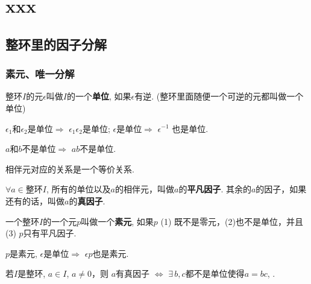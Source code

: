 \chapter{xxx}

\section{整环里的因子分解}

\subsection{素元、唯一分解}

\begin{Definition}[单位]
整环$I$的元$\epsilon$叫做$I$的一个\textbf{单位}, 如果$\epsilon$有逆. (整环里面随便一个可逆的元都叫做一个单位)
\end{Definition}

\begin{Theorem}
$\epsilon_1$和$\epsilon_2$是单位$\Rightarrow$ $\epsilon_1 \epsilon_2$是单位; $\epsilon$是单位$\Rightarrow$ $\epsilon^{-1}$ 也是单位.
\end{Theorem}

\begin{Proposition}
$a$和$b$不是单位$\Rightarrow$ $a b$不是单位.
\end{Proposition}


\begin{Note}
相伴元对应的关系是一个等价关系.
\end{Note}

\begin{Definition}
$\forall a \in $整环$I$, 所有的单位以及$a$的相伴元，叫做$a$的\textbf{平凡因子}. 其余的$a$的因子，如果还有的话，叫做$a$的\textbf{真因子}.
\end{Definition}

\begin{Definition}[素元]
一个整环$I$的一个元$p$叫做一个\textbf{素元}, 如果$p$ (1) 既不是零元，(2)也不是单位，并且 (3) $p$只有平凡因子.
\end{Definition}

\begin{Theorem}
$p$是素元, $\epsilon$是单位$\Rightarrow$ $\epsilon p$也是素元.
\end{Theorem}

\begin{Theorem}[!!]
若$I$是整环, $a \in I$, $a \neq \mathfrak{0}$，则 $a$有真因子 $\Leftrightarrow$ 
$\exists\, b,c$都不是单位使得$a = bc$, .
\end{Theorem}

